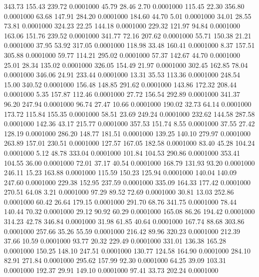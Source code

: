 343.73  155.43  239.72   0.0001000
  45.79   28.46    2.70   0.0001000
 115.45   22.30  356.80   0.0001000
  63.68  147.91  284.20   0.0001000
 184.60   44.70    5.01   0.0001000
  34.01   28.55   73.81   0.0001000
 324.23   22.25  144.18   0.0001000
 229.32  121.97   94.84   0.0001000
 163.06  151.76  239.52   0.0001000
 341.77   72.16  207.62   0.0001000
  55.71  150.38   21.21   0.0001000
  37.95   53.92  317.05   0.0001000
 118.98   33.48  160.41   0.0001000
   8.37  157.51  305.88   0.0001000
  59.77  114.21  295.02   0.0001000
  57.37  142.67   44.70   0.0001000
  25.01   28.34  135.02   0.0001000
 326.05  154.49   21.97   0.0001000
 302.45  162.85   78.04   0.0001000
 346.06   24.91  233.44   0.0001000
  13.31   35.53  113.36   0.0001000
 248.54   15.00  340.52   0.0001000
 156.48  148.85  291.62   0.0001000
 143.86  172.32  208.44   0.0001000
   5.35  157.87  112.46   0.0001000
  27.72  156.54  292.89   0.0001000
 341.37   96.20  247.94   0.0001000
  96.74   27.47   10.66   0.0001000
 190.02   32.73   64.14   0.0001000
 173.72  115.84  155.35   0.0001000
  58.51   23.69  249.24   0.0001000
 232.62  144.58  287.58   0.0001000
 142.36   43.17  215.77   0.0001000
 357.53  151.74    8.55   0.0001000
  37.55   27.42  128.19   0.0001000
 286.20  148.77  181.51   0.0001000
 139.25  140.10  279.97   0.0001000
 263.89  157.01  230.51   0.0001000
 127.57  167.05  182.58   0.0001000
  83.40   45.28  104.24   0.0001000
   5.12   48.78  333.04   0.0001000
 101.84  104.53  290.86   0.0001000
 353.41  104.55   36.00   0.0001000
  72.01   37.17   40.54   0.0001000
 168.79  131.93   93.20   0.0001000
 246.11   15.23  163.88   0.0001000
 115.59  150.23  125.94   0.0001000
 140.04  140.09  247.60   0.0001000
 229.38  152.95  237.59   0.0001000
 335.09  164.33  177.42   0.0001000
 270.51   64.08    3.21   0.0001000
  97.29   89.52   72.69   0.0001000
  30.81   13.03  252.86   0.0001000
  60.42   26.64  179.15   0.0001000
 291.70   68.76  341.75   0.0001000
  78.44  140.44   70.32   0.0001000
  29.12   90.92   60.29   0.0001000
 165.08   86.26  194.42   0.0001000
 314.23   42.78  346.84   0.0001000
  31.98   61.85   40.64   0.0001000
 167.74   88.68  303.86   0.0001000
 257.66   35.26   55.59   0.0001000
 216.42   89.96  320.23   0.0001000
 212.39   37.66   10.59   0.0001000
  93.77   20.32  229.49   0.0001000
 331.01  136.38  165.28   0.0001000
 150.25  148.10  247.51   0.0001000
 130.77  124.58  164.90   0.0001000
 284.10   82.91  271.84   0.0001000
 295.62  157.99   92.30   0.0001000
  64.25   39.09  103.31   0.0001000
 192.37   29.91  149.10   0.0001000
  97.41   33.73  202.24   0.0001000
